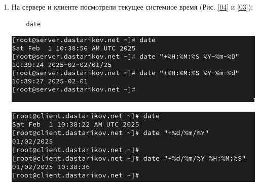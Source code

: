 \begin{enumerate}
\item На сервере и клиенте посмотрели текущее системное время (Рис. \ref{04} и \ref{03}):
  \begin{verbatim}
    date
  \end{verbatim}
\begin{center}
    \centering
    \includegraphics[width=\textwidth]{../images/image04.png}
    \label{04}
\end{center}
\begin{center}
    \centering
    \includegraphics[width=\textwidth]{../images/image03.png}
    \label{03}
\end{center}


\end{enumerate}
